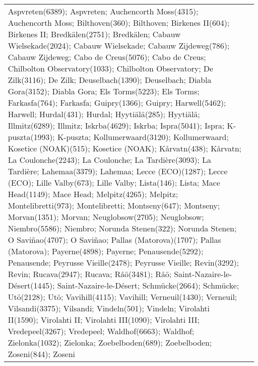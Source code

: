 \documentclass[journal abbreviation, manuscript]{copernicus}
\begin{document}
\begin{table}
\begin{tabularx}{\textwidth}{lX}
     Aspvreten(6389); Aspvreten; Auchencorth Moss(4315); Auchencorth Moss; Bilthoven(360); Bilthoven; Birkenes II(604); Birkenes II; Bredkälen(2751); Bredkälen; Cabauw Wielsekade(2024); Cabauw Wielsekade; Cabauw Zijdeweg(786); Cabauw Zijdeweg; Cabo de Creus(5076); Cabo de Creus; Chilbolton Observatory(1033); Chilbolton Observatory; De Zilk(3116); De Zilk; Deuselbach(1390); Deuselbach; Diabla Gora(3152); Diabla Gora; Els Torms(5223); Els Torms; Farkasfa(764); Farkasfa; Guipry(1366); Guipry; Harwell(5462); Harwell; Hurdal(431); Hurdal; Hyytiälä(285); Hyytiälä; Illmitz(6289); Illmitz; Iskrba(4629); Iskrba; Ispra(5041); Ispra; K-puszta(1993); K-puszta; Kollumerwaard(3120); Kollumerwaard; Kosetice (NOAK)(515); Kosetice (NOAK); Kårvatn(438); Kårvatn; La Coulonche(2243); La Coulonche; La Tardière(3093); La Tardière; Lahemaa(3379); Lahemaa; Lecce (ECO)(1287); Lecce (ECO); Lille Valby(673); Lille Valby; Lista(146); Lista; Mace Head(1149); Mace Head; Melpitz(4265); Melpitz; Montelibretti(973); Montelibretti; Montseny(647); Montseny; Morvan(1351); Morvan; Neuglobsow(2705); Neuglobsow; Niembro(5586); Niembro; Norunda Stenen(322); Norunda Stenen; O Saviñao(4707); O Saviñao; Pallas (Matorova)(1707); Pallas (Matorova); Payerne(4898); Payerne; Penausende(5292); Penausende; Peyrusse Vieille(2478); Peyrusse Vieille; Revin(3292); Revin; Rucava(2947); Rucava; Råö(3481); Råö; Saint-Nazaire-le-Désert(1445); Saint-Nazaire-le-Désert; Schmücke(2664); Schmücke; Utö(2128); Utö; Vavihill(4115); Vavihill; Verneuil(1430); Verneuil; Vilsandi(3375); Vilsandi; Vindeln(501); Vindeln; Virolahti II(1590); Virolahti II; Virolahti III(1090); Virolahti III; Vredepeel(3267); Vredepeel; Waldhof(6663); Waldhof; Zielonka(1032); Zielonka; Zoebelboden(689); Zoebelboden; Zoseni(844); Zoseni \\

\end{tabularx}
\end{table}
\end{document}
